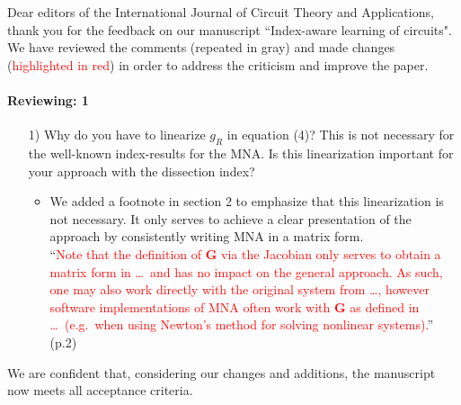 \documentclass[a4paper, 10pt,
    ]{article}
\newcommand{\mb}[1]{\mathbf{#1}}
\begin{document}
    Dear editors of the International Journal of Circuit Theory and Applications,\\

    thank you for the feedback on our manuscript ``Index-aware learning of circuits". We have reviewed the comments (\textcolor{TUDa-0c}{repeated in gray}) and made changes (\textcolor{red}{highlighted in red}) in order to address the criticism and improve the paper.\\

    \paragraph{Reviewing: 1}
    \begin{itemize}
        \item[1)] \textcolor{TUDa-0c}{Why do you have to linearize $g_R$ in equation (4)? This is not necessary for the well-known index-results for the MNA. Is this linearization important for your approach with the dissection index?}
        \begin{itemize}
            \item We added a footnote in section 2 to emphasize that this linearization is not necessary. It only serves to achieve a clear presentation of the approach by consistently writing MNA in a matrix form.\\
            ``\textcolor{red}{Note that the definition of $\mb{G}$ via the Jacobian only serves to obtain a matrix form in \dots\ and has no impact on the general approach. As such, one may also work directly with the original system from \dots, however software implementations of MNA often work with $\mb{G}$ as defined in \dots\ (e.g.~when using Newton's method for solving nonlinear systems).}'' (p.2)
        \end{itemize}
    \end{itemize}

    We are confident that, considering our changes and additions, the manuscript now meets all acceptance criteria.
\end{document}
